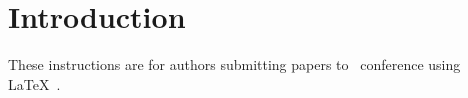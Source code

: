 \section{Introduction}
\label{s:intro}
These instructions are for authors submitting papers to \XX~conference using \LaTeX{}~\cite{latex}.